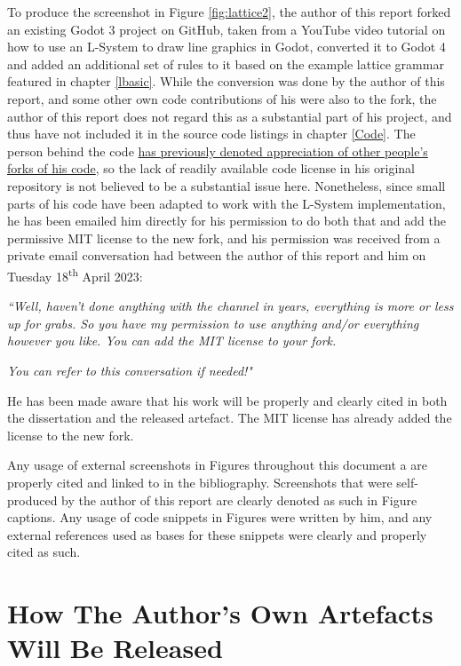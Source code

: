 To produce the screenshot in Figure \ref{fig:lattice2}, the author of this report forked an existing Godot 3 project on GitHub\cite{codatGD3LSystemGH}, taken from a YouTube video tutorial on how to use an L-System to draw line graphics in Godot\cite{codatGD3LSystemYT}, converted it to Godot 4 and added an additional set of rules to it based on the example lattice grammar featured in chapter \ref{lbasic}.\cite{codatGD4LSystemGH} While the conversion was done by the author of this report, and some other own code contributions of his were also to the fork, the author of this report does not regard this as a substantial part of his project, and thus have not included it in the source code listings in chapter \ref{Code}. The person behind the code \hyperlink{https://www.youtube.com/watch?v=eY9XkJERiG0&lc=UgwXjzr7jheuC9hH18h4AaABAg}{has previously denoted appreciation of other people's forks of his code}, so the lack of readily available code license in his original repository is not believed to be a substantial issue here. Nonetheless, since small parts of his code have been adapted to work with the L-System implementation, he has been emailed him directly for his permission to do both that and add the permissive MIT license to the new fork, and his permission was received from a private email conversation had between the author of this report and him on Tuesday 18\textsuperscript{th} April 2023:

\textit{``Well, haven't done anything with the channel in years, everything is more or less up for grabs. So you have my permission to use anything and/or everything however you like. You can add the MIT license to your fork.}

\textit{You can refer to this conversation if needed!"}

He has been made aware that his work will be properly and clearly cited in both the dissertation and the released artefact. The MIT license has already added the license to the new fork.\cite{codatGD4LSystemGH}

Any usage of external screenshots in Figures throughout this document a are properly cited and linked to in the bibliography. Screenshots that were self-produced by the author of this report are clearly denoted as such in Figure captions. Any usage of code snippets in Figures were written by him, and any external references used as bases for these snippets were clearly and properly cited as such.

\section{How The Author's Own Artefacts Will Be Released} \label{howrelease}

